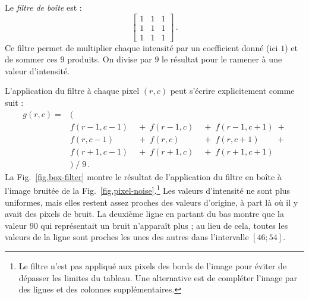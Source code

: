 Le \emph{filtre de boîte} est :
\[
\left[
\begin{array}{ccc}
1 & 1 & 1\\
1 & 1 & 1\\
1 & 1 & 1
\end{array}
\right]\,.
\]
Ce filtre permet de multiplier chaque intensité par un coefficient donné (ici $1$) et de sommer ces $9$ produits. On divise par $9$ le résultat pour le ramener à une valeur d’intensité. 

L'application du filtre à chaque pixel $(r,c)$ peut s'écrire explicitement comme suit :
\[
\begin{array}{llll}
g(r,c) = &(\\
&f(r-1,c-1) & \;+\; f(r-1,c) & \;+\; f(r-1,c+1) \;+\\
&f(r,c-1) & \;+\; f(r,c) & \;+\; f(r,c+1) \;\;\;\;\;\;\;+\\
&f(r+1,c-1) & \;+\; f(r+1,c) & \;+\; f(r+1,c+1)\\
& ) \; / \; 9\,.
\end{array}
\]
La Fig.~\ref{fig.box-filter} montre le résultat de l'application du filtre en boîte à l'image bruitée de la Fig.~\ref{fig.pixel-noise}.\footnote{Le filtre n'est pas appliqué aux pixels des bords de l'image pour éviter de dépasser les limites du tableau. Une alternative est de compléter l’image par des lignes et des colonnes supplémentaires.} Les valeurs d'intensité ne sont plus uniformes, mais elles restent assez proches des valeurs d'origine, à part là où il y avait des pixels de bruit. La deuxième ligne en partant du bas montre que la valeur $90$ qui représentait un bruit n’apparaît plus ; au lieu de cela, toutes les valeurs de la ligne sont proches les unes des autres dans l'intervalle $[46 ; 54]$.

